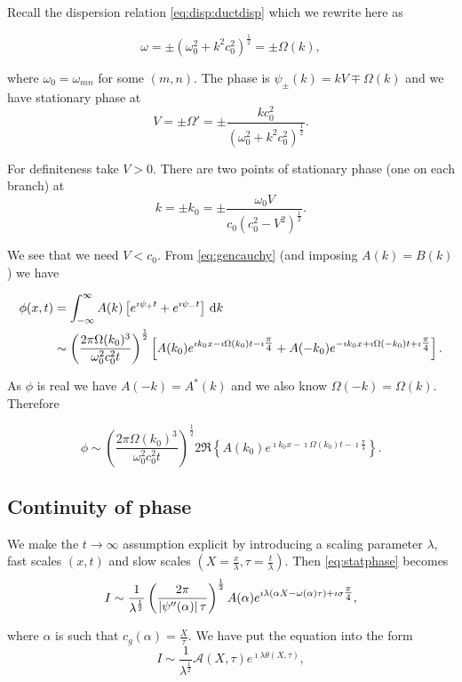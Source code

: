 \documentclass{notes}
\newcommand{\cA}{\mathcal{A}}
\begin{document}
Recall the dispersion relation \eqref{eq:disp:ductdisp} which we
rewrite here as

\[
\omega = \pm \left( \omega_0^2 + k^2 c_0^2 \right)^{\frac{1}{2}}
= \pm \Omega(k),
\]

where $\omega_0 = \omega_{mn}$ for some $(m,n)$.  The
phase is $\psi_\pm(k) = k V \mp \Omega(k)$ and we have
stationary phase at
\[
V = \pm \Omega' = \pm \frac{k c_0^2}{(\omega_0^2 + k^2 c_0^2)^{\frac{1}{2}}}.
\]

For definiteness take $V > 0$.  There are two points of stationary phase
(one on each branch) at
\[
k = \pm k_0 = \pm \frac{\omega_0 V}{c_0 (c_0^2 - V^2)^{\frac{1}{2}}}.
\]

We see that we need $V < c_0$.  From \eqref{eq:gencauchy}
(and imposing $A(k) = B(k)$) we have

\begin{align*}
\phi(x,t) &= \int_{-\infty}^\infty A(k) \left[
e^{\imath \psi_+ t} + e^{\imath \psi_- t}
\right]\, \mathrm{d} k \\
&\sim \left( \frac{2 \pi \Omega(k_0)^3}{\omega_0^2 c_0^2 t}
\right)^{\frac{1}{2}} \left[ A(k_0) e^{\imath k_0 x
- \imath \Omega(k_0) t - \imath \tfrac{\pi}{4}}
+ A(-k_0) e^{-\imath k_0 x
+ \imath \Omega(-k_0) t + \imath \tfrac{\pi}{4} }
\right].
\end{align*}

As $\phi$ is real we have $A(-k) = A^\ast(k)$ and we also
know $\Omega(-k) = \Omega(k)$.  Therefore

\[
\phi \sim  \left( \frac{2 \pi \Omega(k_0)^3}{\omega_0^2 c_0^2 t}
\right)^{\frac{1}{2}}
2 \Re \left\{ A(k_0) e^{\imath k_0 x
- \imath \Omega(k_0) t - \imath \tfrac{\pi}{4}} \right\}.
\]

\subsection{Continuity of phase}

We make the $t\to \infty$ assumption explicit by introducing
a scaling parameter $\lambda$, fast scales $(x,t)$ and
slow scales $(X = \tfrac{x}{\lambda}, \tau = \tfrac{t}{\lambda})$.
Then \eqref{eq:statphase} becomes
\[
I \sim \frac{1}{\lambda^{\frac{1}{2}}}
\left( \frac{2 \pi}{\left|\psi''(\alpha)\right| \tau} \right)^{\frac{1}{2}}
A(\alpha) e^{\imath \lambda ( \alpha X - \omega(\alpha) \tau)
 + \imath \sigma \tfrac{\pi}{4}},
\]

where $\alpha$ is such that $c_g(\alpha) = \tfrac{X}{\tau}$. We have
put the equation into the form
\begin{equation}\label{eq:Ilim}
I \sim \frac{1}{\lambda^{\frac{1}{2}}} \cA(X,\tau)
e^{\imath \lambda \theta(X,\tau)},
\end{equation}
\end{document}
